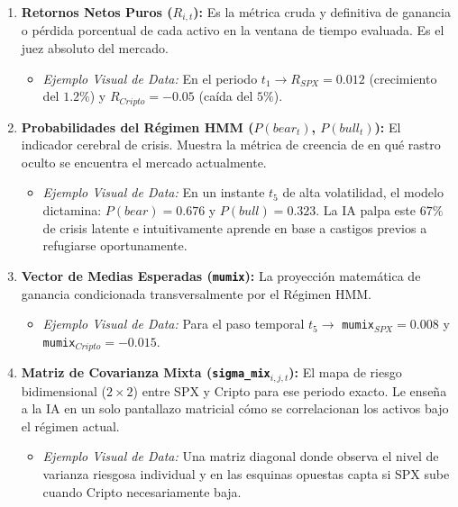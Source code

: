 \documentclass[11pt,a4paper]{article}
\begin{document}
\begin{enumerate}
    \item \textbf{Retornos Netos Puros ($R_{i,t}$):} Es la métrica cruda y definitiva de ganancia o pérdida porcentual de cada activo en la ventana de tiempo evaluada. Es el juez absoluto del mercado.
    \begin{itemize}
        \item \textit{Ejemplo Visual de Data:} En el periodo $t_1 \rightarrow R_{SPX} = 0.012$ (crecimiento del $1.2\%$) y $R_{Cripto} = -0.05$ (caída del $5\%$).
    \end{itemize}
    
    \item \textbf{Probabilidades del Régimen HMM ($P(bear_t)$, $P(bull_t)$):} El indicador cerebral de crisis. Muestra la métrica de creencia de en qué rastro oculto se encuentra el mercado actualmente.
    \begin{itemize}
        \item \textit{Ejemplo Visual de Data:} En un instante $t_5$ de alta volatilidad, el modelo dictamina: $P(bear) = 0.676$ y $P(bull) = 0.323$. La IA palpa este $67\%$ de crisis latente e intuitivamente aprende en base a castigos previos a refugiarse oportunamente.
    \end{itemize}

    \item \textbf{Vector de Medias Esperadas (\texttt{mumix}):} La proyección matemática de ganancia condicionada transversalmente por el Régimen HMM.
    \begin{itemize}
        \item \textit{Ejemplo Visual de Data:} Para el paso temporal $t_5 \rightarrow$ \texttt{mumix}$_{SPX} = 0.008$ y \texttt{mumix}$_{Cripto} = -0.015$.
    \end{itemize}

    \item \textbf{Matriz de Covarianza Mixta (\texttt{sigma\_mix}$_{i,j,t}$):} El mapa de riesgo bidimensional ($2 \times 2$) entre SPX y Cripto para ese periodo exacto. Le enseña a la IA en un solo pantallazo matricial cómo se correlacionan los activos bajo el régimen actual.
    \begin{itemize}
        \item \textit{Ejemplo Visual de Data:} Una matriz diagonal donde observa el nivel de varianza riesgosa individual y en las esquinas opuestas capta si SPX sube cuando Cripto necesariamente baja.
    \end{itemize}


\end{enumerate}
\end{document}
